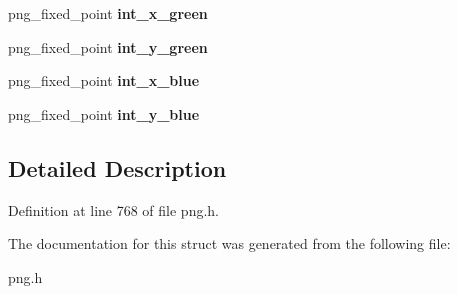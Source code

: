 \begin{DoxyCompactItemize}
\item 
\hypertarget{structpng__info__struct_a85faa4b47eed4fb1195956f915a5a211}{png\+\_\+fixed\+\_\+point {\bfseries int\+\_\+x\+\_\+green}}\label{structpng__info__struct_a85faa4b47eed4fb1195956f915a5a211}

\item 
\hypertarget{structpng__info__struct_ac196558e0bdf7a55aec72e2730d6f042}{png\+\_\+fixed\+\_\+point {\bfseries int\+\_\+y\+\_\+green}}\label{structpng__info__struct_ac196558e0bdf7a55aec72e2730d6f042}

\item 
\hypertarget{structpng__info__struct_a4844eadf8657ef08b6e7d577a0491538}{png\+\_\+fixed\+\_\+point {\bfseries int\+\_\+x\+\_\+blue}}\label{structpng__info__struct_a4844eadf8657ef08b6e7d577a0491538}

\item 
\hypertarget{structpng__info__struct_aba0a216dd3141d61b24b3a92a875a334}{png\+\_\+fixed\+\_\+point {\bfseries int\+\_\+y\+\_\+blue}}\label{structpng__info__struct_aba0a216dd3141d61b24b3a92a875a334}

\end{DoxyCompactItemize}


\subsection{Detailed Description}


Definition at line 768 of file png.\+h.



The documentation for this struct was generated from the following file\+:\begin{DoxyCompactItemize}
\item 
png.\+h\end{DoxyCompactItemize}
